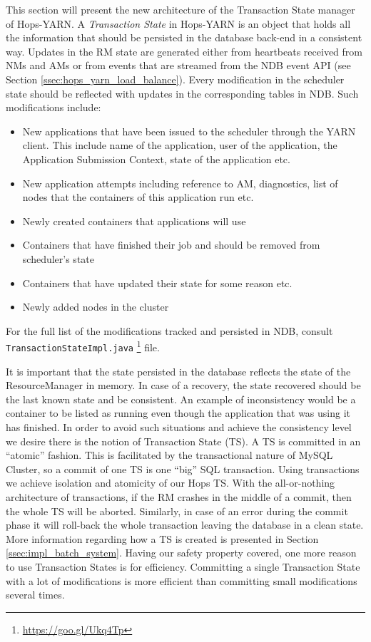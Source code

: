 This section will present the new architecture of the Transaction
State manager of Hops-YARN. A \emph{Transaction State} in Hops-YARN is
an object that holds all the information that should be persisted in
the database back-end in a consistent way. Updates in the RM state are
generated either from heartbeats received from NMs and AMs or from
events that are streamed from the NDB event API (see Section
\ref{ssec:hops_yarn_load_balance}). Every modification in the
scheduler state should be reflected with updates in the corresponding
tables in NDB. Such modifications include:
\begin{itemize}
\item New applications that have been issued to the scheduler through
the YARN client. This include name of the application, user of
the application, the Application Submission Context, state of the
application etc.

\item New application attempts including reference to AM,
diagnostics, list of nodes that the containers of this application run
etc.

\item Newly created containers that applications will use

\item Containers that have finished their job and should be removed
from scheduler's state

\item Containers that have updated their state for some reason etc.

\item Newly added nodes in the cluster
\end{itemize}

For the full list of the modifications tracked and persisted in NDB,
consult \texttt{TransactionStateImpl.java}
\footnote{\url{https://goo.gl/Ukq4Tp}} file.

It is important that the state persisted in the database reflects the
state of the ResourceManager in memory. In case of a recovery, the
state recovered should be the last known state and be consistent. An
example of inconsistency would be a container to be listed as running
even though the application that was using it has finished. In order to
avoid such situations and achieve the consistency level we desire
there is the notion of Transaction State (TS). A TS is committed in an
``atomic'' fashion. This is facilitated by the transactional nature of
MySQL Cluster, so a commit of one TS is one ``big'' SQL
transaction. Using transactions we achieve isolation and atomicity of
our Hops TS. With the all-or-nothing architecture of transactions, if
the RM crashes in the middle of a commit, then the whole TS will be
aborted. Similarly, in case of an error during the commit phase it will
roll-back the whole transaction leaving the database in a clean state.
More information regarding how a TS is created is presented in Section
\ref{ssec:impl_batch_system}. Having our safety property covered, one
more reason to use Transaction States is for efficiency. Committing a
single Transaction State with a lot of modifications is more efficient
than committing small modifications several times.

